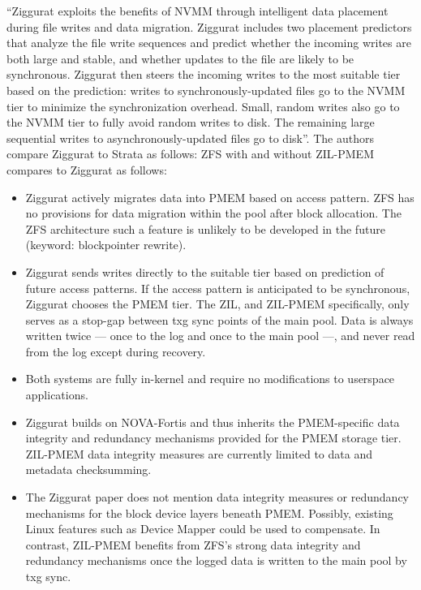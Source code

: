 \documentclass[12pt,a4paper,twoside]{book}
\begin{document}
``Ziggurat exploits the benefits of NVMM through intelligent data placement during file writes and data migration.
Ziggurat includes two placement predictors that analyze the file write sequences and predict whether the incoming writes are both large and stable, and whether updates to the file are likely to be synchronous.
Ziggurat then steers the incoming writes to the most suitable tier based on the prediction: writes to synchronously-updated files go to the NVMM tier to minimize the synchronization overhead.
Small, random writes also go to the NVMM tier to fully avoid random writes to disk. The remaining large sequential writes to asynchronously-updated files go to disk''.
The authors compare Ziggurat to Strata as follows:
ZFS with and without ZIL-PMEM compares to Ziggurat as follows:
\begin{itemize}[noitemsep,beginpenalty=100000,midpenalty=100000]
    \item Ziggurat actively migrates data into PMEM based on access pattern.
          ZFS has no provisions for data migration within the pool after block allocation.
          The ZFS architecture such a feature is unlikely to be developed in the future (keyword: blockpointer rewrite).
    \item Ziggurat sends writes directly to the suitable tier based on prediction of future access patterns.
          If the access pattern is anticipated to be synchronous, Ziggurat chooses the PMEM tier.
          The ZIL, and ZIL-PMEM specifically, only serves as a stop-gap between txg sync points of the main pool.
          Data is always written twice --- once to the log and once to the main pool ---, and never read from the log except during recovery.
    \item Both systems are fully in-kernel and require no modifications to userspace applications.
    \item Ziggurat builds on NOVA-Fortis and thus inherits the PMEM-specific data integrity and redundancy mechanisms provided for the PMEM storage tier.
          ZIL-PMEM data integrity measures are currently limited to data and metadata checksumming.
    \item The Ziggurat paper does not mention data integrity measures or redundancy mechanisms for the block device layers beneath PMEM.
          Possibly, existing Linux features such as Device Mapper could be used to compensate.
          In contrast, ZIL-PMEM benefits from ZFS’s strong data integrity and redundancy mechanisms once the logged data is written to the main pool by txg sync.

\end{itemize}
\end{document}
